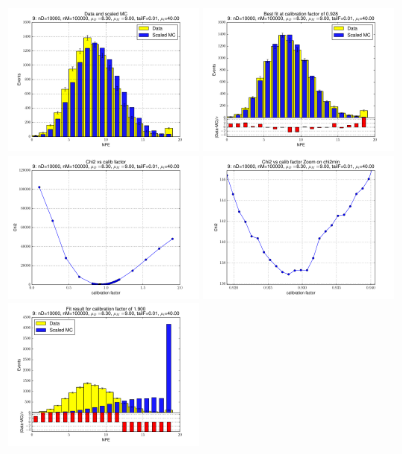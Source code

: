 
 \begin{figure}[htbp] \begin{center} 
\includegraphics[width=0.45\textwidth]{../FIGURES/09/FIG_Data_and_scaled_MC.pdf} 
\includegraphics[width=0.45\textwidth]{../FIGURES/09/FIG_Best_fit_at_calibration_factor_of_0_928.pdf} 
\includegraphics[width=0.45\textwidth]{../FIGURES/09/FIG_Chi2_vs_calib_factor.pdf} 
\includegraphics[width=0.45\textwidth]{../FIGURES/09/FIG_Chi2_vs_calib_factor_Zoom_on_chi2min.pdf} 
\includegraphics[width=0.45\textwidth]{../FIGURES/09/FIG_Fit_result_for_calibration_factor_of_1_900.pdf} 

\end{center}
\end{figure}
